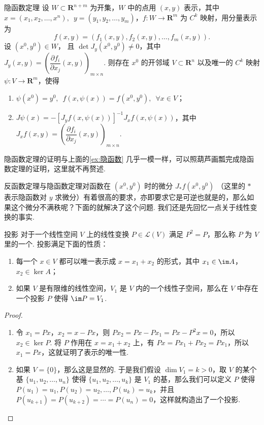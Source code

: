 \begin{theorem}{隐函数定理}{}
    设 $W\subset \mathbf{R}^{n+m}$ 为开集，$W$ 中的点用 $(x, y)$ 表示，其中 $x = (x_1, x_2, \ldots, x^n), \enspace y = (y_1, y_2, \ldots, y_m)$，$f\colon W\to \mathbf{R}^m$ 为 $C^k$ 映射，用分量表示为 \[f(x, y) = (f_1(x, y), f_2(x, y), \ldots, f_m(x, y)).\]
    设 $(x^0, y^0)\in W$， 且 $\det J_y(x^0, y^0)\neq 0$，其中 $J_y(x, y) = \left(\dfrac{\partial f_i}{\partial x_j}(x, y)\right)_{m\times n}$. 则存在 $x^0$ 的开邻域 $V\subset \mathbf{R}^n$ 以及唯一的 $C^k$ 映射 $\psi\colon V\to \mathbf{R}^m$，使得
    \begin{enumerate}[label=(\arabic*)]
        \item $\psi(x^0) = y^0,\enspace f(x, \psi(x)) = f(x^0, y^0),\enspace \forall x\in V$；
        \item $J\psi(x) = -[J_yf(x, \psi(x))]^{-1}J_xf(x, \psi(x))$，其中 $J_xf(x, y) = \left(\dfrac{\partial f_i}{\partial x_j}(x, y)\right)_{m\times n}$.
    \end{enumerate}
\end{theorem}

隐函数定理的证明与上面的\autoref{ex:隐函数} 几乎一模一样，可以照葫芦画瓢完成隐函数定理的证明，这里就不再赘述.

反函数定理与隐函数定理对函数在 $(x^0, y^0)$ 时的微分 $J_*f(x^0, y^0)$ （这里的 $*$ 表示隐函数对 $y$ 求微分）有着很高的要求，亦即要求它是可逆也就是的，那么如果这个微分不满秩呢？下面的就解决了这个问题. 我们还是先回忆一点关于线性变换的事实.

\begin{theorem}{投影}{}
    对于一个线性空间 $V$ 上的线性变换 $P\in \mathcal{L}(V)$ 满足 $P^2 = P$，那么称 $P$ 为 $V$ 里的一个. 投影满足下面的性质：
    \begin{enumerate}[label=(\arabic*)]
        \item 每一个 $x\in V$ 都可以唯一表示成 $x = x_1+x_2$ 的形式，其中 $x_1\in\im A$，$x_2\in\ker A$；
        \item 如果 $V$ 是有限维的线性空间，$V_1$ 是 $V$ 内的一个线性子空间，那么在 $V$ 中存在一个投影 $P$ 使得 $\im P = V_1$.
    \end{enumerate}
\end{theorem}

\begin{proof}
    \begin{enumerate}[label=(\arabic*)]
        \item 令 $x_1 = Px$，$x_2 = x - Px$，则 $Px_2 = Px - Px_1 = Px - P^2x = 0$，所以 $x_2\in\ker P$. 将 $P$ 作用在 $x = x_1 + x_2$ 上，有 $Px = Px_1 + Px_2 = Px_1$，所以 $x_1 = Px$，这就证明了表示的唯一性.
        \item  如果 $V = \{0\}$，那么这是显然的. 于是我们假设 $\dim V_1 = k >0$，取 $V$ 的某个基 $\{u_1, u_2, \ldots, u_n\}$ 使得 $\{u_1, u_2, \ldots, u_k\}$ 是 $V_1$ 的基，那么我们可以定义 $P$ 使得 $P(u_1) = u_1, P(u_2) = u_2, \ldots, P(u_k) = u_k$，并且 $P(u_{k+1}) = P(u_{k+2}) = \cdots = P(u_n) = 0$，这样就构造出了一个投影.
    \end{enumerate}
\end{proof}


